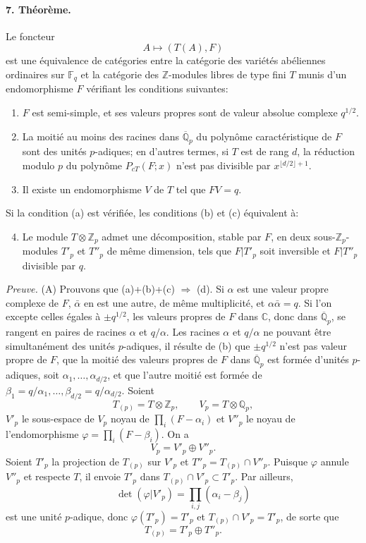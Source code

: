 \documentclass[10pt]{article}
\newcommand{\C}{\mathbb C}
\newcommand{\Fq}{\mathbb F_q}
\newcommand{\Q}{\mathbb Q}
\newcommand{\Z}{\mathbb Z}
\begin{document}
\paragraph{7. Théorème.} Le foncteur
\[
A\longmapsto (T(A),F)
\]
est une équivalence de catégories entre la catégorie des variétés abéliennes ordinaires sur $\Fq$ et la catégorie des $\Z$-modules libres de type fini $T$ munis d'un endomorphisme $F$ vérifiant les conditions suivantes:
\begin{enumerate}[label=(\alph*)]
\item $F$ est semi-simple, et ses valeurs propres sont de valeur absolue complexe $q^{1/2}$.
\item La moitié au moins des racines dans $\overline{\Q}_p$ du polynôme caractéristique de $F$ sont des unités $p$-adiques; en d'autres termes, si $T$ est de rang $d$, la réduction modulo $p$ du polynôme $P_{cT}(F;x)$ n'est pas divisible par $x^{\lfloor d/2\rfloor+1}$.
\item Il existe un endomorphisme $V$ de $T$ tel que $FV=q$.
\end{enumerate}
Si la condition (a) est vérifiée, les conditions (b) et (c) équivalent à:
\begin{enumerate}[label=(\alph*)]
\setcounter{enumi}{3}
\item Le module $T\otimes\Z_p$ admet une décomposition, stable par $F$, en deux sous-$\Z_p$-modules $T'_p$ et $T''_p$ de même dimension, tels que $F|T'_p$ soit inversible et $F|T''_p$ divisible par $q$.
\end{enumerate}

\emph{Preuve.} (A) Prouvons que (a)+(b)+(c) $\Rightarrow$ (d). Si $\alpha$ est une valeur propre complexe de $F$, $\bar\alpha$ en est une autre, de même multiplicité, et $\alpha\bar\alpha=q$. Si l'on excepte celles égales à $\pm q^{1/2}$, les valeurs propres de $F$ dans $\C$, donc dans $\overline{\Q}_p$, se rangent en paires de racines $\alpha$ et $q/\alpha$. Les racines $\alpha$ et $q/\alpha$ ne pouvant être simultanément des unités $p$-adiques, il résulte de (b) que $\pm q^{1/2}$ n'est pas valeur propre de $F$, que la moitié des valeurs propres de $F$ dans $\overline{\Q}_p$ est formée d'unités $p$-adiques, soit $\alpha_1,\ldots,\alpha_{d/2}$, et que l'autre moitié est formée de $\beta_1=q/\alpha_1,\ldots,\beta_{d/2}=q/\alpha_{d/2}$. Soient
\[
T_{(p)}=T\otimes\Z_p,\qquad V_p=T\otimes\Q_p,
\]
$V'_p$ le sous-espace de $V_p$ noyau de $\prod_i(F-\alpha_i)$ et $V''_p$ le noyau de l'endomorphisme $\varphi=\prod_i(F-\beta_i)$. On a
\[
V_p=V'_p\oplus V''_p.
\]
Soient $T'_p$ la projection de $T_{(p)}$ sur $V'_p$ et $T''_p=T_{(p)}\cap V''_p$. Puisque $\varphi$ annule $V''_p$ et respecte $T$, il envoie $T'_p$ dans $T_{(p)}\cap V'_p\subset T'_p$. Par ailleurs,
\[
\det(\varphi|V'_p)=\prod_{i,j}(\alpha_i-\beta_j)
\]
est une unité $p$-adique, donc $\varphi(T'_p)=T'_p$ et $T_{(p)}\cap V'_p=T'_p$, de sorte que
\[
T_{(p)}=T'_p\oplus T''_p.
\]
\end{document}
